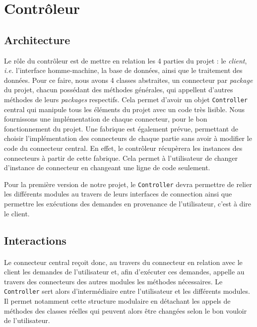 
\section{Contrôleur}
\subsection{Architecture}

Le rôle du contrôleur est de mettre en relation les 4 parties du projet : le \textit{client}, \textit{i.e.} l'interface homme-machine, la base de données, ainsi que le traitement des données. Pour ce faire, nous avons 4 classes abstraites, un connecteur par \textit{package} du projet, chacun possédant des méthodes générales, qui appellent d'autres méthodes de leurs \textit{packages} respectifs. Cela permet d'avoir un objet \texttt{Controller} central qui manipule tous les éléments du projet avec un code très lisible. Nous fournissons une implémentation de chaque connecteur, pour le bon fonctionnement du projet. Une fabrique est également prévue, permettant de choisir l'implémentation des connecteurs de chaque partie sans avoir à modifier le code du connecteur central. En effet, le contrôleur récupèrera les instances des connecteurs à partir de cette fabrique. Cela permet à l'utilisateur de changer d'instance de connecteur en changeant une ligne de code seulement.

Pour la première version de notre projet, le \texttt{Controller} devra permettre de relier les différents modules au travers de leurs interfaces de connection ainsi que permettre les exécutions des demandes en provenance de l'utilisateur, c'est à dire le client. 

\subsection{Interactions}
\paragraph{}
Le connecteur central reçoit donc, au travers du connecteur en relation avec le client les demandes de l'utilisateur et, afin d'exécuter ces demandes, appelle au travers des connecteurs des autres modules les méthodes nécessaires. Le \texttt{Controller} sert alors d'intermédiaire entre l'utilisateur et les différents modules. Il permet notamment cette structure modulaire en détachant les appels de méthodes des classes réelles qui peuvent alors être changées selon le bon vouloir de l'utilisateur.
